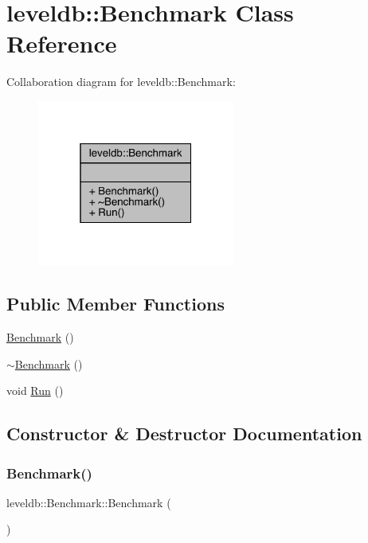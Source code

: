 \hypertarget{classleveldb_1_1_benchmark}{}\section{leveldb\+::Benchmark Class Reference}
\label{classleveldb_1_1_benchmark}


Collaboration diagram for leveldb\+::Benchmark\+:
\nopagebreak
\begin{figure}[H]
\begin{center}
\leavevmode
\includegraphics[width=184pt]{classleveldb_1_1_benchmark__coll__graph}
\end{center}
\end{figure}
\subsection*{Public Member Functions}
\begin{DoxyCompactItemize}
\item 
\mbox{\hyperlink{classleveldb_1_1_benchmark_a05d001d05283f6d1d589d417b42aa736}{Benchmark}} ()
\item 
\mbox{\hyperlink{classleveldb_1_1_benchmark_a32bd4ebe6df5e4f664a944d71b066bd5}{$\sim$\+Benchmark}} ()
\item 
void \mbox{\hyperlink{classleveldb_1_1_benchmark_a2f262afa0c7d10fcf531fe9657fba490}{Run}} ()
\end{DoxyCompactItemize}


\subsection{Constructor \& Destructor Documentation}
\mbox{\label{classleveldb_1_1_benchmark_a05d001d05283f6d1d589d417b42aa736}} 
\subsubsection{\texorpdfstring{Benchmark()}{Benchmark()}}
{\footnotesize\ttfamily leveldb\+::\+Benchmark\+::\+Benchmark (\begin{DoxyParamCaption}{ }\end{DoxyParamCaption})\hspace{0.3cm}{\ttfamily [inline]}}

